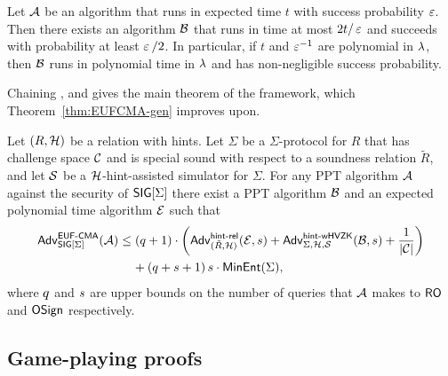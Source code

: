 \begin{corollary}\label{cor:exp-to-ppt}
    Let $\mathcal{A}$ be an algorithm that runs in expected time $t$ with success
    probability $\operatorname{\varepsilon}$.
    Then there exists an algorithm $\mathcal{B}$ that runs in time at most $2t/\operatorname{\varepsilon}$
    and succeeds with probability at least $\operatorname{\varepsilon}/2$.
    In particular, if $t$ and $\operatorname{\varepsilon}^{-1}$ are polynomial in $\lambda$, then $\mathcal{B}$
    runs in polynomial time in $\lambda$ and has non-negligible success
    probability.
\end{corollary}

Chaining ,  and  gives the
main theorem of the framework, which Theorem~\ref{thm:EUFCMA-gen} improves upon.

\begin{theorem}\label{thm:abdpw}
    Let $(R, \mathcal{H})$ be a relation with hints.
    Let $\Sigma$ be a $\Sigma$-protocol for $R$ that has challenge space $\mathcal{C}$
    and is special sound with respect to a soundness relation $\tilde{R}$, and
    let $\operatorname{\mathcal{S}}$ be a $\mathcal{H}$-hint-assisted simulator for $\Sigma$.
    For any PPT algorithm $\mathcal{A}$ against the \EUFCMA security of $\mathsf{SIG}[\Sigma]$
    there exist a PPT algorithm $\mathcal{B}$ and an expected polynomial time algorithm
    $\mathcal{E}$ such that
    \begin{equation}\label{eq:abdpw}
        \begin{aligned}
            \eufcmaadv{\SIG[\Sigma]}{\adv}
            &\leq (\numRO+1)\cdot
            \left(\hintreladv{\tilde{R}}{\hintdistr}{\cE}{\numOSign}
            + \hinthvzkadv{\Sigma}{\hintdistr}{\Sim}{\bdv, \numOSign}
            + \frac{1}{\abs{\cC}}\right) \\
            &\phantom{\leq ~}
            + (\numRO + \numOSign + 1)\,\numOSign \cdot \minentropy{\Sigma},
        \end{aligned}
    \end{equation}
    where $q$ and $s$ are upper bounds on the number of queries
    that $\mathcal{A}$ makes to $\mathsf{RO}$ and $\mathsf{OSign}$ respectively.
\end{theorem}

\subsection{Game-playing proofs}\label{sec:gameops}


